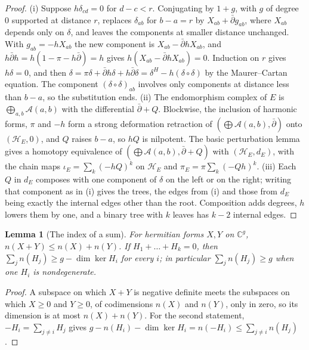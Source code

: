 \documentclass[11pt,reqno]{amsart}
\theoremstyle{plain}
\newtheorem{lemma}[theorem]{Lemma}
\theoremstyle{definition}
\theoremstyle{remark}
\newcommand{\CC}{\mathbb{C}}
\newcommand{\cH}{\mathcal{H}}
\newcommand{\cA}{\mathcal{A}}
\begin{document}
\begin{proof}
(i) Suppose $h\delta_{cd}=0$ for $d-c<r$. Conjugating by $1+g$, with $g$ of
degree $0$ supported at distance $r$, replaces $\delta_{ab}$ for $b-a=r$ by
$X_{ab}+\bar\partial g_{ab}$, where $X_{ab}$ depends only on $\delta$, and
leaves the components at smaller distance unchanged. With
$g_{ab}=-hX_{ab}$ the new component is $X_{ab}-\bar\partial hX_{ab}$, and
$h\bar\partial h=h(1-\pi-h\bar\partial)=h$ gives $h(X_{ab}-\bar\partial
hX_{ab})=0$. Induction on $r$ gives $h\delta=0$, and then
$\delta=\pi\delta+\bar\partial h\delta+h\bar\partial\delta
=\delta^{H}-h(\delta\circ\delta)$ by the Maurer--Cartan equation. The
component $(\delta\circ\delta)_{ab}$ involves only components at distance
less than $b-a$, so the substitution ends.
(ii) The endomorphism complex of $E$ is $\bigoplus_{a,b}\cA(a,b)$ with the
differential $\bar\partial+Q$. Blockwise, the inclusion of harmonic forms,
$\pi$ and $-h$ form a strong deformation retraction of
$(\bigoplus\cA(a,b),\bar\partial)$ onto $(\cH_{E},0)$, and $Q$ raises $b-a$,
so $hQ$ is nilpotent. The basic perturbation lemma gives a homotopy
equivalence of $(\bigoplus\cA(a,b),\bar\partial+Q)$ with $(\cH_{E},d_{E})$,
with the chain maps $\iota_{E}=\sum_{k}(-hQ)^{k}$ on $\cH_{E}$ and
$\pi_{E}=\pi\sum_{k}(-Qh)^{k}$. (iii) Each $Q$ in $d_{E}$ composes with one
component of $\delta$ on the left or on the right; writing that component as
in (i) gives the trees, the edges from (i) and those from $d_{E}$ being
exactly the internal edges other than the root. Composition adds degrees,
$h$ lowers them by one, and a binary tree with $k$ leaves has $k-2$ internal
edges.
\end{proof}

\begin{lemma}[The index of a sum]\label{lem:indexsum}
For hermitian forms $X,Y$ on $\CC^{g}$, $n(X+Y)\le n(X)+n(Y)$. If
$H_{1}+\dots+H_{k}=0$, then $\sum_{j}n(H_{j})\ge g-\dim\ker H_{i}$ for every
$i$; in particular $\sum_{j}n(H_{j})\ge g$ when one $H_{i}$ is
nondegenerate.
\end{lemma}

\begin{proof}
A subspace on which $X+Y$ is negative definite meets the subspaces on which
$X\ge0$ and $Y\ge0$, of codimensions $n(X)$ and $n(Y)$, only in zero, so its
dimension is at most $n(X)+n(Y)$. For the second statement,
$-H_{i}=\sum_{j\ne i}H_{j}$ gives
$g-n(H_{i})-\dim\ker H_{i}=n(-H_{i})\le\sum_{j\ne i}n(H_{j})$.
\end{proof}
\end{document}

